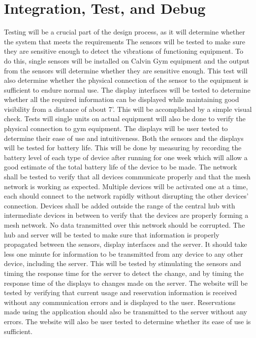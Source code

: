 \documentclass[PPFS.tex]{template/subfiles}
\begin{document}
\section{Integration, Test, and Debug}

Testing will be a crucial part of the design process, as it will determine whether the system that meets the requirements 
The sensors will be tested to make sure they are sensitive enough to detect the vibrations of functioning equipment.  To do this, single sensors will be installed on Calvin Gym equipment and the output from the sensors will determine whether they are sensitive enough. This test will also determine whether the physical connection of the sensor to the equipment is sufficient to endure normal use.
The display interfaces will be tested to determine whether all the required information can be displayed while maintaining good visibility from a distance of about 7’. This will be accomplished by a simple visual check. Tests will single units on actual equipment will also be done to verify the physical connection to gym equipment. The displays will be user tested to determine their ease of use and intuitiveness.
Both the sensors and the displays will be tested for battery life. This will be done by measuring by recording the battery level of each type of device after running for one week which will allow a good estimate of the total battery life of the device to be made.
The network shall be tested to verify that all devices communicate properly and that the mesh network is working as expected. Multiple devices will be activated one at a time, each should connect to the network rapidly without disrupting the other devices’ connection. Devices shall be added outside the range of the central hub with intermediate devices in between to verify that the devices are properly forming a mesh network. No data transmitted over this network should be corrupted.
The hub and server will be tested to make sure that information is properly propagated between the sensors, display interfaces and the server. It should take less one minute for information to be transmitted from any device to any other device, including the server. This will be tested by stimulating the sensors and timing the response time for the server to detect the change, and by timing the response time of the displays to changes made on the server. 
The website will be tested by verifying that current usage and reservation information is received without any communication errors and is displayed to the user. Reservations made using the application should also be transmitted to the server without any errors. The website will also be user tested to determine whether its ease of use is sufficient.
\end{document}

